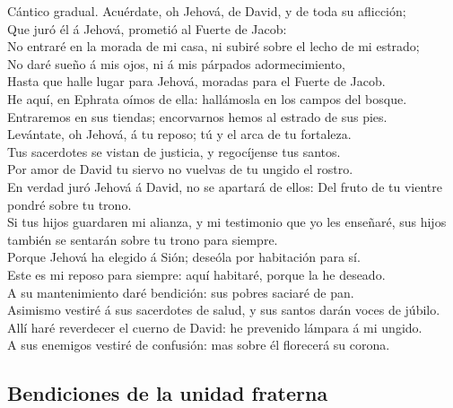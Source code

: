  Cántico gradual. Acuérdate, oh Jehová, de David, y de
toda su aflicción;\\
 Que juró él á Jehová, prometió al Fuerte de Jacob:\\
 No entraré en la morada de mi casa, ni subiré sobre el
lecho de mi estrado;\\
 No daré sueño á mis ojos, ni á mis párpados
adormecimiento,\\
 Hasta que halle lugar para Jehová, moradas para el Fuerte
de Jacob.\\
 He aquí, en Ephrata oímos de ella: hallámosla en los
campos del bosque.\\
 Entraremos en sus tiendas; encorvarnos hemos al estrado
de sus pies.\\
 Levántate, oh Jehová, á tu reposo; tú y el arca de tu
fortaleza.\\
 Tus sacerdotes se vistan de justicia, y regocíjense tus
santos.\\
 Por amor de David tu siervo no vuelvas de tu ungido el
rostro.\\
 En verdad juró Jehová á David, no se apartará de ellos:
Del fruto de tu vientre pondré sobre tu trono.\\
 Si tus hijos guardaren mi alianza, y mi testimonio que
yo les enseñaré, sus hijos también se sentarán sobre tu trono para
siempre.\\
 Porque Jehová ha elegido á Sión; deseóla por habitación
para sí.\\
 Este es mi reposo para siempre: aquí habitaré, porque la
he deseado.\\
 A su mantenimiento daré bendición: sus pobres saciaré de
pan.\\
 Asimismo vestiré á sus sacerdotes de salud, y sus santos
darán voces de júbilo.\\
 Allí haré reverdecer el cuerno de David: he prevenido
lámpara á mi ungido.\\
 A sus enemigos vestiré de confusión: mas sobre él
florecerá su corona.

\hypertarget{bendiciones-de-la-unidad-fraterna}{%
\subsection{Bendiciones de la unidad
fraterna}\label{bendiciones-de-la-unidad-fraterna}}

